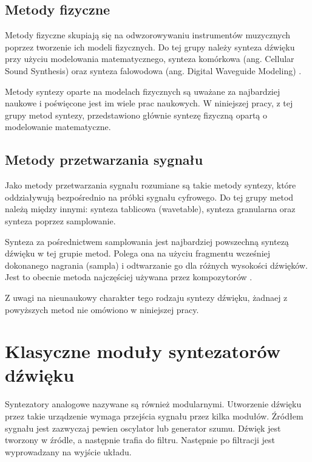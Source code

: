 \subsection{Metody fizyczne}
Metody fizyczne skupiają się na odwzorowywaniu instrumentów muzycznych poprzez tworzenie ich modeli fizycznych. Do tej grupy należy synteza dźwięku przy użyciu modelowania matematycznego, synteza komórkowa (ang. Cellular Sound Synthesis) oraz synteza falowodowa (ang. Digital Waveguide Modeling) \cite{czyzewski_dzwiek_cyfrowy}.

Metody syntezy oparte na modelach fizycznych są uważane za najbardziej naukowe i poświęcone jest im wiele prac naukowych. W niniejszej pracy, z tej grupy metod syntezy, przedstawiono głównie syntezę fizyczną opartą o modelowanie matematyczne.

\subsection{Metody przetwarzania sygnału}
Jako metody przetwarzania sygnału rozumiane są takie metody syntezy, które oddziaływują bezpośrednio na próbki sygnału cyfrowego. Do tej grupy metod należą między innymi: synteza tablicowa (wavetable), synteza granularna oraz synteza poprzez samplowanie.

Synteza za pośrednictwem samplowania jest najbardziej powszechną syntezą dźwięku w tej grupie metod. Polega ona na użyciu fragmentu wcześniej dokonanego nagrania (sampla) i odtwarzanie go dla różnych wysokości dźwięków. Jest to obecnie metoda najczęściej używana przez kompozytorów \cite{misra_cook_przetw_syg}.

Z uwagi na nieunaukowy charakter tego rodzaju syntezy dźwięku, żadnaej z powyższych metod nie omówiono w niniejszej pracy.



\section{Klasyczne moduły syntezatorów dźwięku}
Syntezatory analogowe nazywane są również modularnymi. Utworzenie dźwięku przez takie urządzenie wymaga przejścia sygnału przez kilka modułów. Źródłem sygnału jest zazwyczaj pewien oscylator lub generator szumu. Dźwięk jest tworzony w źródle, a następnie trafia do filtru. Następnie po filtracji jest wyprowadzany na wyjście układu.

